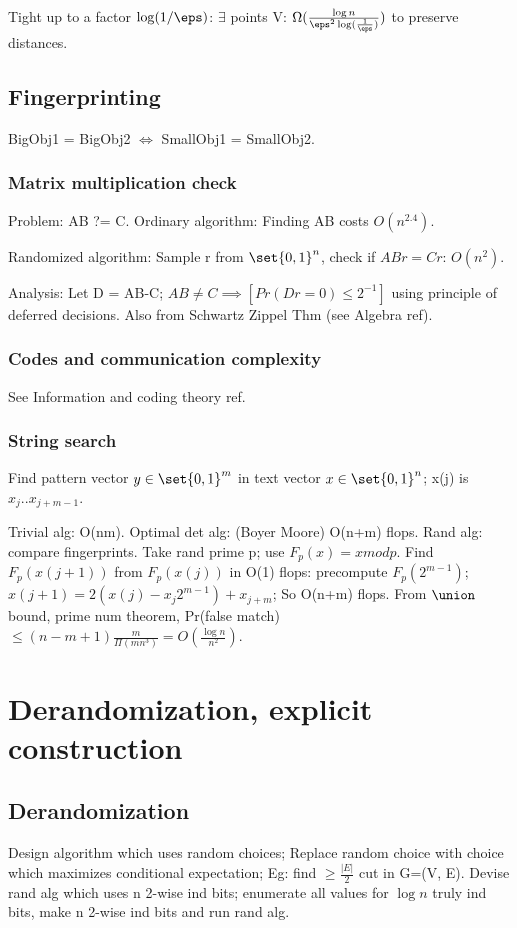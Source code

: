 \documentclass[oneside, article]{memoir}
\begin{document}
Tight up to a factor $\log(1/\eps)$: $\exists$ points V: $\Omega(\frac{\log n}{\eps^{2} \log (\frac{1}{\eps})})$ to preserve distances.

\section{Fingerprinting}

BigObj1 = BigObj2 $\Leftrightarrow$ SmallObj1 = SmallObj2.

\subsection{Matrix multiplication check}
Problem: AB ?= C. Ordinary algorithm: Finding AB costs $O(n^{2.4})$.

Randomized algorithm: Sample r from $\set{0, 1}^{n}$, check if $ABr = Cr$: $O(n^{2})$.

Analysis: Let D = AB-C; $AB \neq C \implies [Pr(Dr = 0) \leq 2^{-1}]$ using principle of deferred decisions. Also from Schwartz Zippel Thm (see Algebra ref).

\subsection{Codes and communication complexity}
See Information and coding theory ref.

\subsection{String search}
Find pattern vector $y \in \set{0, 1}^{m}$ in text vector $x \in \set{0, 1}^{n}$; x(j) is $x_{j} .. x_{j+m-1}$.

Trivial alg: O(nm). Optimal det alg: (Boyer Moore) O(n+m) flops. Rand alg: compare fingerprints. Take rand prime p; use $F_{p}(x) = x mod p$. Find $F_{p}(x(j+1))$ from $F_{p}(x(j))$ in O(1) flops: precompute $F_{p}(2^{m-1})$; $x(j+1) = 2(x(j) - x_{j}2^{m-1}) + x_{j+m}$; So O(n+m) flops. From $\union$ bound, prime num theorem, Pr(false match) $\leq (n-m+1)\frac{m}{\Pi(mn^{3})} = O(\frac{\log n}{n^{2}})$. \tbc



\chapter{Derandomization, explicit construction}
\section{Derandomization}
Design algorithm which uses random choices; Replace random choice with choice which maximizes conditional expectation; Eg: find $\geq \frac{|E|}{2}$ cut in G=(V, E). Devise rand alg which uses n 2-wise ind bits; enumerate all values for $\log n$ truly ind bits, make n 2-wise ind bits and run rand alg.
\end{document}
